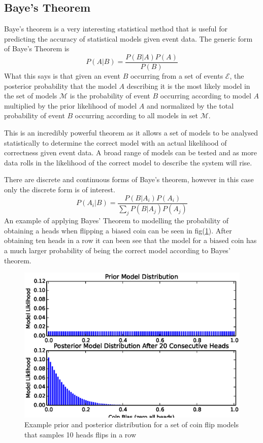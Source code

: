 \subsection{Baye's Theorem} 
Baye's theorem is a very interesting statistical method that is useful for predicting the accuracy of statistical models given event data. The generic form of Baye's Theorem is 
\begin{equation}
P(A|B) = \frac{P(B|A)P(A)}{P(B)} 
\label{eq:bayes}
\end{equation}
What this says is that given an event $B$ occurring from a set of events $\mathcal{E}$, the posterior probability that the model $A$ describing it is the most likely model in the set of models $\mathcal{M}$ is the probability of event $B$ occurring according to model $A$ multiplied by the prior likelihood of model $A$ and normalized by the total probability of event $B$ occurring according to all models in set $\mathcal{M}$.\cite{bayes}

This is an incredibly powerful theorem as it allows a set of models to be analysed statistically to determine the correct model with an actual likelihood of correctness given event data. A broad range of models can be tested and as more data rolls in the likelihood of the correct model to describe the system will rise.

There are discrete and continuous forms of Baye's theorem, however in this case only the discrete form is of interest. 
\begin{equation}
P(A_i|B) = \frac{P(B|A_i)P(A_i)}{\sum \limits_j P(B|A_j)P(A_j)}
\label{eq:discretebayes}
\end{equation}
An example of applying Bayes' Theorem to modelling the probability of obtaining a heads when flipping a biased coin can be seen in fig(\ref{fig:bayes}). After obtaining ten heads in a row it can been see that the model for a biased coin has a much larger probability of being the correct model according to Bayes' theorem. 
\begin{figure}[ht!]
\centering
\includegraphics[scale=0.8]{Figures/bayes.eps}
\caption{Example prior and posterior distribution for a set of coin flip models that samples 10 heads flips in a row}
\label{fig:bayes}
\end{figure}
